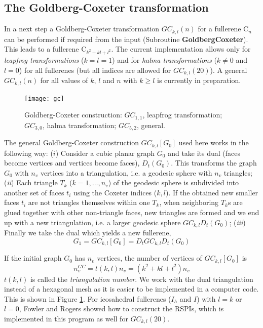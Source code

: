 \documentclass[article,a4paper,twoside]{memoir}
\newcommand{\C}[1]{\ensuremath{\mathrm{C}_{#1}}}
\newcommand{\funname}[1]{{\color{blue}\textbf{#1}}}
\begin{document}
\subsection{The Goldberg-Coxeter transformation}

In a next step a Goldberg-Coxeter transformation $GC_{k,l}(n)$ for a fullerene \C{n} can be performed if required from the input
(Subroutine \funname{GoldbergCoxeter}). This leads to a fullerene C$_{k^2+kl+l^2}$. The current implementation allows only for
\textit{leapfrog transformations} ($k=l=1$) and for \textit{halma transformations} ($k \neq 0$ and $l=0$) for all fullerenes
(but all indices are allowed for $GC_{k,l}(20)$). A general $GC_{k,l}(n)$ for all values of $k$, $l$ and $n$ with $k \geq l$ 
is currently in preparation. 


 \begin{figure}[htbp]
   	\centering
  	\texttt{[image: gc]}
    \caption{Goldberg-Coxeter construction: $GC_{1,1}$, leapfrog transformation; $GC_{3,0}$, halma transformation; $GC_{5,2}$, general.}
	\label{pic:GoldbergCoxeter}
 \end{figure}

The general Goldberg-Coxeter construction $GC_{k,l}[G_{0}]$ used here works in the following way: ($i$) Consider
a cubic planar graph $G_{0}$ and take its dual (faces become vertices and
vertices become faces), $D_{t}(G_{0})$. This transforms the graph $G_{0}$
with $n_v$ vertices into a triangulation, i.e. a geodesic sphere with $n_v$ triangles; (\textit{ii})
Each triangle $T_{k}$ ($k=1, \dots, n_{v}$) of the geodesic sphere is
subdivided into another set of faces $t_i$ using the Coxeter indices ($k,l$).
If the obtained new smaller faces $t_i$ are not
triangles themselves within one $T_k$, when neighboring $T_k$s are glued
together with other non-triangle faces, new triangles are formed and we end up with a new triangulation,
i.e. a larger geodesic sphere $GC_{k,l}D_{t}(G_{0})$;
(\textit{iii}) Finally we take the dual which yields a new fullerene,
\begin{equation}
 	G_1 = GC_{k,l}[G_0] = D_t GC_{k,l} D_t(G_0)
	\label{eq:GC}
\end{equation}

If the initial graph $G_0$ has $n_v$ vertices, the number of vertices of $GC_{k,l}[G_0]$ is
\begin{equation}
	n_v^{GC} = t(k,l)n_v = (k^2 + kl + l^2)n_v
	\label{eq:GCvertexcount} 
\end{equation}
$t(k,l)$ is called the {\em triangulation number}. We work with the dual triangulation instead of a hexagonal mesh as it is easier to be implemented in a computer code.
This is shown in Figure \ref{pic:GoldbergCoxeter}. For icosahedral fullerenes ($I_h$ and $I$) with $l = k$ or $l = 0$, Fowler and Rogers 
showed how to construct the RSPIs,\cite{Rogers} which is implemented in this program as well for $GC_{k,l}(20)$.
\end{document}
